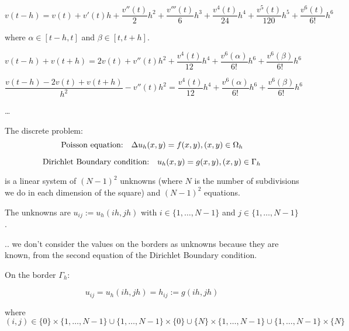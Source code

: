 \begin{equation*}
v(t-h) = v(t) + v'(t) h + \frac{v''(t)}{2} h^2 + \frac{v'''(t)}{6} h^3 + \frac{v^{4}(t)}{24} h^4  + \frac{v^{5}(t)}{120} h^5 + \frac{v^{6}(t)}{6!} h^6
\end{equation*}

where $\alpha \in [t-h, t]$ and $\beta \in [t, t+h]$.

\begin{equation*}
v(t-h) + v(t+h) = 2v(t) + v''(t) h^2 + \frac{v^{4}(t)}{12} h^4 + \frac{v^{6}(\alpha)}{6!} h^6 + \frac{v^{6}(\beta)}{6!} h^6
\end{equation*}

\begin{equation*}
\frac{v(t-h) - 2v(t)+ v(t+h)}{h^2} - v''(t) h^2 = \frac{v^{4}(t)}{12} h^4 + \frac{v^{6}(\alpha)}{6!} h^6 + \frac{v^{6}(\beta)}{6!} h^6
\end{equation*}


\dots


The discrete problem:
\begin{equation*}
\text{Poisson equation:\quad} \Delta u_h(x, y) = f(x, y), (x, y) \in \Omega_h
\end{equation*}

\begin{equation*}
\text{Dirichlet Boundary condition:\quad} u_h(x, y) = g(x, y), (x, y) \in \Gamma_h
\end{equation*}

is a linear system of $(N-1)^2$ unknowns (where $N$ is the number of subdivisions we do in each dimension of the square)  and $(N-1)^2$ equations.

The unknowns are $u_{ij} := u_h (ih, jh)$ with $i \in \{1, \dots, N-1 \}$ and $j \in \{1, \dots, N-1 \}$.


.. we don't consider the values on the borders as unknowns because they are known, from the second equation of the Dirichlet Boundary condition.

On the border $\Gamma_h$:

\begin{equation*}
u_{ij} = u_h (ih, jh) = h_{ij} := g(ih, jh)
\end{equation*}

where 
\begin{equation*}
(i,j) \in \{0\} \times \{1, \dots, N-1 \} \cup \{1, \dots, N-1 \} \times \{0\} \cup \{N\} \times  \{1, \dots, N-1 \} \cup  \{1, \dots, N-1 \} \times \{N\}
\end{equation*}

